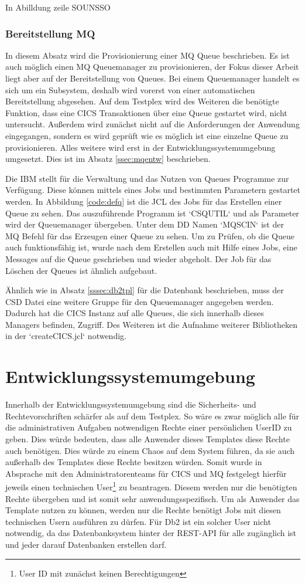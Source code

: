 In Abilldung zeile SOUNSSO

\subsubsection{Bereitstellung MQ}
In diesem Absatz wird die Provisionierung einer MQ Queue beschrieben.
Es ist auch möglich einen MQ Queuemanager zu provisionieren, der Fokus dieser Arbeit liegt aber auf der Bereitstellung von Queues.
Bei einem Queuemanager handelt es sich um ein Subsystem, deshalb wird vorerst von einer automatischen Bereitstellung abgesehen.
Auf dem Testplex wird des Weiteren die benötigte Funktion, dass eine CICS Transaktionen über eine Queue gestartet wird, nicht untersucht.
Außerdem wird zunächst nicht auf die Anforderungen der Anwendung eingegangen, sondern es wird geprüft wie es möglich ist eine einzelne Queue zu provisionieren.
Alles weitere wird erst in der Entwicklungssystemumgebung umgesetzt.
Dies ist im Absatz \ref{ssec:mqentw} beschrieben.

Die IBM stellt für die Verwaltung und das Nutzen von Queues Programme zur Verfügung.
Diese können mittels eines Jobs und bestimmten Parametern gestartet werden.
In Abbildung \ref{code:defq} ist die JCL des Jobs für das Erstellen einer Queue zu sehen.
Das auszuführende Programm ist `CSQUTIL` und als Parameter wird der Queuemanager übergeben.
Unter dem DD Namen `MQSCIN` ist der MQ Befehl für das Erzeugen einer Queue zu sehen.
Um zu Prüfen, ob die Queue auch funktionsfähig ist, wurde nach dem Erstellen auch mit Hilfe eines Jobs, eine Messages auf die Queue geschrieben und wieder abgeholt.
Der Job für das Löschen der Queues ist ähnlich aufgebaut.

Ähnlich wie in Absatz \ref{sssec:db2tpl} für die Datenbank beschrieben, muss der CSD Datei eine weitere Gruppe für den Queuemanager angegeben werden.
Dadurch hat die CICS Instanz auf alle Queues, die sich innerhalb dieses Managers befinden, Zugriff.
Des Weiteren ist die Aufnahme weiterer Bibliotheken in der `createCICS.jcl` notwendig.

\section{Entwicklungssystemumgebung}
Innerhalb der Entwicklungssystemumgebung sind die Sicherheits- und Rechtevorschriften schärfer als auf dem Testplex.
So wäre es zwar möglich alle für die administrativen Aufgaben notwendigen Rechte einer persönlichen UserID zu geben.
Dies würde bedeuten, dass alle Anwender dieses Templates diese Rechte auch benötigen.
Dies würde zu einem Chaos auf dem System führen, da sie auch außerhalb des Templates diese Rechte besitzen würden.
Somit wurde in Absprache mit den Administratorenteams für CICS und MQ festgelegt hierfür jeweils einen technischen User\footnote{User ID mit zunächst keinen Berechtigungen} zu beantragen.
Diesem werden nur die benötigten Rechte übergeben und ist somit sehr anwendungsspezifisch.
Um als Anwender das Template nutzen zu können, werden nur die Rechte benötigt Jobs mit diesen technischen Usern ausführen zu dürfen.
Für Db2 ist ein solcher User nicht notwendig, da das Datenbanksystem hinter der REST-API für alle zugänglich ist und jeder darauf Datenbanken erstellen darf.

